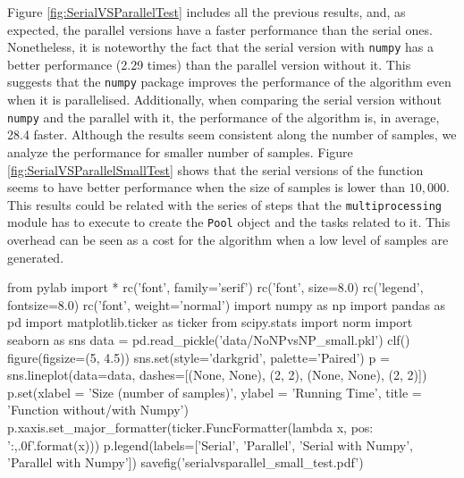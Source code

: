 \documentclass[11pt]{article}
\begin{document}
Figure \ref{fig:SerialVSParallelTest} includes all the previous results, and, as expected, the parallel versions have a
faster performance than the serial ones. Nonetheless, it is noteworthy the fact that the serial version with \texttt{numpy}
has a better performance (2.29 times) than the parallel version without it. This suggests that the \texttt{numpy} package
improves the performance of the algorithm even when it is parallelised. Additionally, when comparing the serial version without
\texttt{numpy} and the parallel with it, the performance of the algorithm is, in average, 28.4 faster. Although the results
seem consistent along the number of samples, we analyze the performance for smaller number of samples. Figure \ref{fig:SerialVSParallelSmallTest}
shows that the serial versions of the function seems to have better performance when the size of samples is lower than
$10,000$. This results could be related with the series of steps that the \texttt{multiprocessing} module has to execute
to create the \texttt{Pool} object and the tasks related to it. This overhead can be seen as a cost for the algorithm when
a low level of samples are generated.

\begin{pycode}
from pylab import *
rc('font', family='serif')
rc('font', size=8.0)
rc('legend', fontsize=8.0)
rc('font', weight='normal')
import numpy as np
import pandas as pd
import matplotlib.ticker as ticker
from scipy.stats import norm
import seaborn as sns
data = pd.read_pickle('data/NoNPvsNP_small.pkl')
clf()
figure(figsize=(5, 4.5))
sns.set(style='darkgrid', palette='Paired')
p = sns.lineplot(data=data, dashes=[(None, None), (2, 2), (None, None), (2, 2)])
p.set(xlabel = 'Size (number of samples)', ylabel = 'Running Time', title = 'Function without/with Numpy')
p.xaxis.set_major_formatter(ticker.FuncFormatter(lambda x, pos: '{:,.0f}'.format(x)))
p.legend(labels=['Serial', 'Parallel', 'Serial with Numpy', 'Parallel with Numpy'])
savefig('serialvsparallel_small_test.pdf')
\end{pycode}
\end{document}
